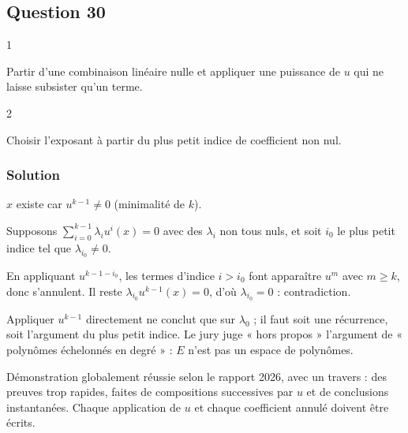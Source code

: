 \documentclass[11pt,a4paper]{article}
\newcommand{\equationajustee}[1]{%
  \sbox{\boiteequation}{$\displaystyle #1$}%
  \ifdim\wd\boiteequation>\linewidth
    \[\resizebox{\linewidth}{!}{\usebox{\boiteequation}}\]%
  \else
    \[#1\]%
  \fi}
\begin{document}
\hypertarget{question-30}{%
\subsection{Question 30}\label{question-30}}

\begin{indication}{1}

Partir d'une combinaison linéaire nulle et appliquer une puissance de \(u\) qui ne laisse subsister qu'un terme.

\end{indication}

\begin{indication}{2}

Choisir l'exposant à partir du plus petit indice de coefficient non nul.

\end{indication}

\hypertarget{solution-29}{%
\subsubsection{Solution}\label{solution-29}}

\(x\) existe car \(u^{k-1}\neq0\) (minimalité de \(k\)).

Supposons \(\sum_{i=0}^{k-1}\lambda_iu^i(x)=0\) avec des \(\lambda_i\) non tous nuls, et soit \(i_0\) le plus petit indice tel que \(\lambda_{i_0}\neq0\).

En appliquant \(u^{k-1-i_0}\), les termes d'indice \(i>i_0\) font apparaître \(u^m\) avec \(m\ge k\), donc s'annulent. Il reste \(\lambda_{i_0}u^{k-1}(x)=0\), d'où \(\lambda_{i_0}=0\) : contradiction.

\equationajustee{\boxed{(u^{k-1}(x),\dots,u(x),x)\text{ est libre.}}}

\begin{piege}

Appliquer \(u^{k-1}\) directement ne conclut que sur \(\lambda_0\) ; il faut soit une récurrence, soit l'argument du plus petit indice. Le jury juge « hors propos » l'argument de « polynômes échelonnés en degré » : \(E\) n'est pas un espace de polynômes.

\end{piege}

\begin{jury}

Démonstration globalement réussie selon le rapport 2026, avec un travers : des preuves trop rapides, faites de compositions successives par \(u\) et de conclusions instantanées. Chaque application de \(u\) et chaque coefficient annulé doivent être écrits.

\end{jury}
\end{document}
